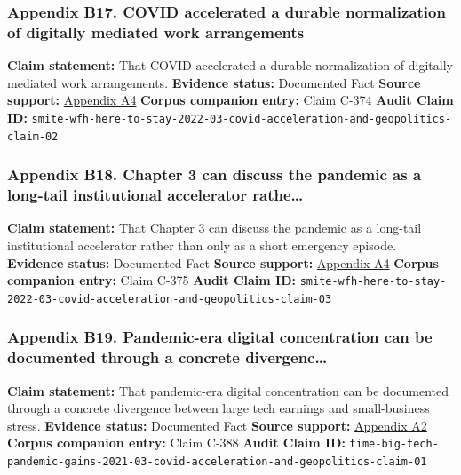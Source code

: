 \documentclass[
  american,
  11pt,
  letterpaper,
]{article}
\begin{document}
\subsubsection{Appendix B17. COVID accelerated a durable normalization
of digitally mediated work
arrangements}\label{ch-03-appendix-b17-covid-accelerated-a-durable-normalization-of-digitally-mediated-work-arrangements}

\textbf{Claim statement:} That COVID accelerated a durable normalization
of digitally mediated work arrangements. \textbf{Evidence status:}
Documented Fact \textbf{Source support:}
\hyperref[ch-03-appendix-a4-work-from-home-is-here-to-stay-call-for-flexibility-in-post-pandemic-work-policies]{Appendix
A4} \textbf{Corpus companion entry:} Claim C-374 \textbf{Audit Claim
ID:}
\texttt{smite-wfh-here-to-stay-2022-03-covid-acceleration-and-geopolitics-claim-02}

\subsubsection{Appendix B18. Chapter 3 can discuss the pandemic as a
long-tail institutional accelerator
rathe\ldots{}}\label{ch-03-appendix-b18-chapter-3-can-discuss-the-pandemic-as-a-long-tail-institutional-accelerator-rathe}

\textbf{Claim statement:} That Chapter 3 can discuss the pandemic as a
long-tail institutional accelerator rather than only as a short
emergency episode. \textbf{Evidence status:} Documented Fact
\textbf{Source support:}
\hyperref[ch-03-appendix-a4-work-from-home-is-here-to-stay-call-for-flexibility-in-post-pandemic-work-policies]{Appendix
A4} \textbf{Corpus companion entry:} Claim C-375 \textbf{Audit Claim
ID:}
\texttt{smite-wfh-here-to-stay-2022-03-covid-acceleration-and-geopolitics-claim-03}

\subsubsection{Appendix B19. Pandemic-era digital concentration can be
documented through a concrete
divergenc\ldots{}}\label{ch-03-appendix-b19-pandemic-era-digital-concentration-can-be-documented-through-a-concrete-divergenc}

\textbf{Claim statement:} That pandemic-era digital concentration can be
documented through a concrete divergence between large tech earnings and
small-business stress. \textbf{Evidence status:} Documented Fact
\textbf{Source support:}
\hyperref[ch-03-appendix-a2-big-tech-announces-striking-pandemic-gains-as-small-businesses-strain-to-find-their-footing]{Appendix
A2} \textbf{Corpus companion entry:} Claim C-388 \textbf{Audit Claim
ID:}
\texttt{time-big-tech-pandemic-gains-2021-03-covid-acceleration-and-geopolitics-claim-01}
\end{document}
